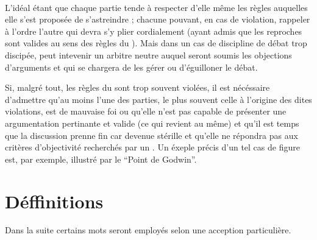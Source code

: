\paragraph{}
L’idéal étant que chaque partie tende à respecter d’elle même les règles auquelles elle s’est proposée de s’astreindre ; chacune pouvant, en cas de violation, rappeler à l’ordre l’autre qui devra s’y plier cordialement (ayant admis que les reproches sont valides au sens des règles du \mainabbr{}). Mais dans un cas de discipline de débat trop discipée, peut intevenir un arbitre neutre auquel seront soumis les objections d’arguments et qui se chargera de les gérer ou d’éguilloner le débat.

Si, malgré tout, les règles du \mainabbr{} sont trop souvent violées, il est nécéssaire d’admettre qu’au moins l’une des parties, le plus souvent celle à l’origine des dites violations, est de mauvaise foi ou qu’elle n’est pas capable de présenter une argumentation pertinante et valide (ce qui revient au même) et qu’il est temps que la discussion prenne fin car devenue stérille et qu’elle ne répondra pas aux critères d’objectivité recherchés par un \mainabbr{}. Un éxeple précis d’un tel cas de figure est, par exemple, illustré par le \enquote{Point de Godwin}.


\section{Déffinitions}
Dans la suite certains mots seront employés selon une acception particulière.

